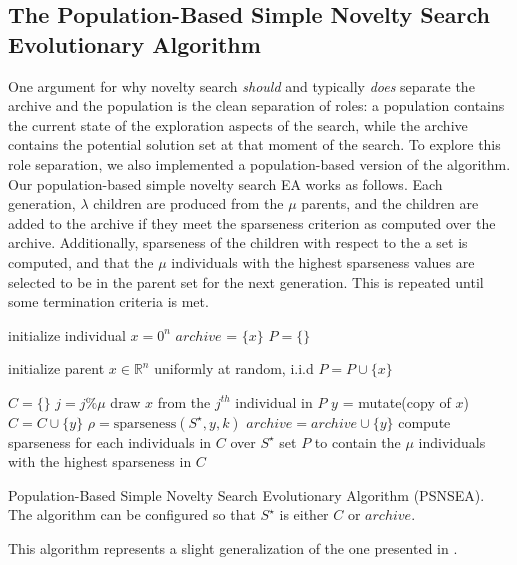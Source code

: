 \documentclass[twoside]{article}
\newcommand{\IR}{\mathbb{R}}
\begin{document}
\subsection{The Population-Based Simple Novelty Search Evolutionary Algorithm}
\label{subsec:psns}
One argument for why novelty search \emph{should} and typically \emph{does} separate the archive and the population is the clean separation of roles:  a population contains the current state of the exploration aspects of the search, while the archive contains the potential solution set at that moment of the search.  To explore this role separation, we also implemented a population-based version of the algorithm.  Our population-based simple novelty search EA works as follows.  Each generation, $\lambda$ children are produced from the $\mu$ parents, and the children are added to the archive if they meet the sparseness criterion as computed over the archive.  Additionally, sparseness of the children with respect to the a set is computed, and that the $\mu$ individuals with the highest sparseness values are selected to be in the parent set for the next generation.  This is repeated until some termination criteria is met.  
%
\begin{algorithm}[h]
  \SetAlgoLined
  \DontPrintSemicolon 
  
  \;
    
  initialize individual $x = 0^n$\;
  $archive$ = $\{x\}$\;
  $P = \{\}$
  
   {
    initialize parent $x \in \IR^n$ uniformly at random, i.i.d\;
    $P = P \cup \{x\}$\;
   }
   
   {
    $C = \{\}$\;
     {
      $j = j \% \mu$\;
      draw $x$ from the $j^{th}$ individual in $P$\;
      $y$ = mutate(copy of $x$)\;
      $C = C \cup \{y\}$\;
      $\rho = \mbox{sparseness}(S^\star, y, k)$\;
       {
        $archive = archive \cup \{y\}$\;
        }
     }
    compute sparseness for each individuals in $C$ over $S^\star$\;
    set $P$ to contain the $\mu$ individuals with the highest sparseness in $C$\; 
  }
  \caption{Population-Based Simple Novelty Search Evolutionary Algorithm (PSNSEA).  The algorithm can be configured so that $S^\star$ is either $C$ or $archive$.}
\end{algorithm}
%
This algorithm represents a slight generalization of the one presented in \citet{Wiegand2021flairs}.
\end{document}
